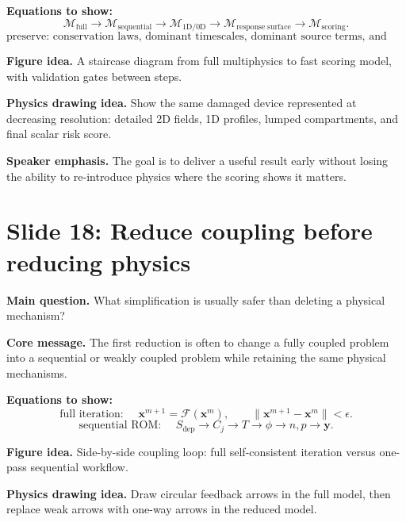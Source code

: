 \documentclass[11pt]{article}
\begin{document}
\textbf{Equations to show:}
\begin{equation*}
\mathcal{M}_{\mathrm{full}}
\rightarrow
\mathcal{M}_{\mathrm{sequential}}
\rightarrow
\mathcal{M}_{\mathrm{1D/0D}}
\rightarrow
\mathcal{M}_{\mathrm{response\;surface}}
\rightarrow
\mathcal{M}_{\mathrm{scoring}}.
\end{equation*}
\begin{equation*}
\text{preserve: conservation laws, dominant timescales, dominant source terms, and output sensitivity.}
\end{equation*}

\textbf{Figure idea.} A staircase diagram from full multiphysics to fast scoring model, with validation gates between steps.

\textbf{Physics drawing idea.} Show the same damaged device represented at decreasing resolution: detailed 2D fields, 1D profiles, lumped compartments, and final scalar risk score.

\textbf{Speaker emphasis.} The goal is to deliver a useful result early without losing the ability to re-introduce physics where the scoring shows it matters.

\section{Slide 18: Reduce coupling before reducing physics}
\begin{physicsbox}
\textbf{Main question.} What simplification is usually safer than deleting a physical mechanism?
\end{physicsbox}

\textbf{Core message.} The first reduction is often to change a fully coupled problem into a sequential or weakly coupled problem while retaining the same physical mechanisms.

\textbf{Equations to show:}
\begin{equation*}
\text{full iteration: }\quad
\mathbf{x}^{m+1}=\mathcal{F}(\mathbf{x}^{m}),
\qquad
\|\mathbf{x}^{m+1}-\mathbf{x}^{m}\|<\epsilon.
\end{equation*}
\begin{equation*}
\text{sequential ROM: }\quad
S_{\mathrm{dep}}\to C_j\to T\to \phi\to n,p\to\mathbf{y}.
\end{equation*}

\textbf{Figure idea.} Side-by-side coupling loop: full self-consistent iteration versus one-pass sequential workflow.

\textbf{Physics drawing idea.} Draw circular feedback arrows in the full model, then replace weak arrows with one-way arrows in the reduced model.
\end{document}
